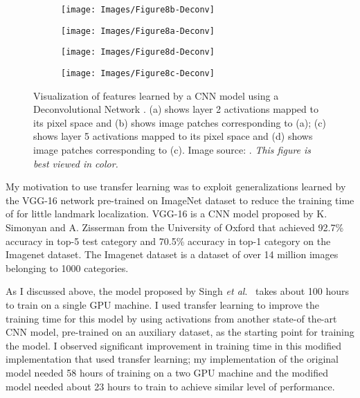 \documentclass [11pt,letterpaper ,openany ]{report}
\begin{document}
    \begin{figure}[t]
    \centering
        \begin{subfigure}[b]{0.23\linewidth}
            \centering
            \texttt{[image: Images/Figure8b-Deconv]}
            \caption{}
        \end{subfigure}    
        \begin{subfigure}[b]{0.23\linewidth}
            \centering
            \texttt{[image: Images/Figure8a-Deconv]}
            \caption{}
        \end{subfigure}
        \begin{subfigure}[b]{0.23\linewidth}
            \centering
            \texttt{[image: Images/Figure8d-Deconv]}
            \caption{}
        \end{subfigure}                
        \begin{subfigure}[b]{0.23\linewidth}
            \centering
            \texttt{[image: Images/Figure8c-Deconv]}
            \caption{}
        \end{subfigure}
        \caption{Visualization of features learned by a CNN model using a Deconvolutional Network \cite{zeiler2014visualizing}. (a) shows layer 2 activations mapped to its pixel space and (b) shows image patches corresponding to (a); (c) shows layer 5 activations mapped to its pixel space and (d) shows image patches corresponding to (c). Image source: \cite{zeiler2014visualizing}. \textit{This figure is best viewed in color.}}
        \label{fig:devonv}
    \end{figure}

    My motivation to use transfer learning was to exploit generalizations learned by the VGG-16 network \cite{simonyan2014very} pre-trained on ImageNet \cite{russakovsky2015imagenet} dataset to reduce the training time of for little landmark localization. VGG-16 \cite{simonyan2014very} is a CNN model proposed by K. Simonyan and A. Zisserman from the University of Oxford that achieved 92.7\% accuracy in top-5 test category and 70.5\% accuracy in top-1 category on the Imagenet dataset. The Imagenet dataset \cite{russakovsky2015imagenet} is a dataset of over 14 million images belonging to 1000 categories.

    As I discussed above, the model proposed by Singh \textit{et al}.\ \cite{Singh_2016_CVPR} takes about 100 hours to train on a single GPU machine. I used transfer learning to improve the training time for this model by using activations from another state-of the-art CNN model, pre-trained on an auxiliary dataset, as the starting point for training the model. I observed significant improvement in training time in this modified implementation that used transfer learning; my implementation of the original model needed 58 hours of training on a two GPU machine and the modified model needed about 23 hours to train to achieve similar level of performance.
\end{document}
